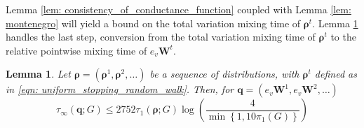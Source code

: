 \documentclass{article}
\newcommand{\1}{\mathbf{1}}
\newcommand{\qbf}{\mathbf{q}}
\newcommand{\rhobf}{\bm{\rho}}
\newcommand{\Wbf}{\mathbf{W}}
\theoremstyle{aldenthm}
\newtheorem{lemma}{Lemma}
\begin{document}
Lemma \ref{lem: consistency_of_conductance_function} coupled with Lemma \ref{lem: montenegro} will yield a bound on the total variation mixing time of $\rhobf^t$. Lemma \ref{lem: tv_mixing_to_pointwise_mixing} handles the last step, conversion from the total variation mixing time of $\rhobf^t$ to the relative pointwise mixing time of $e_v \Wbf^t$. 
\begin{lemma}
\label{lem: tv_mixing_to_pointwise_mixing}
	Let $\rhobf = (\rhobf^1, \rhobf^2, \ldots)$ be a sequence of distributions, with $\rhobf^t$ defined as in \eqref{eqn: uniform_stopping_random_walk}. Then, for $\qbf = (e_v\Wbf^1, e_v\Wbf^2, \ldots)$
	\begin{equation*}
	\tau_{\infty}(\qbf; G) \leq 2752 \tau_1(\rhobf; G) \log \left(\frac{4}{\min\left\{1,10 \pi_1(G)\right\}}\right)
	\end{equation*}
\end{lemma}
\end{document}
